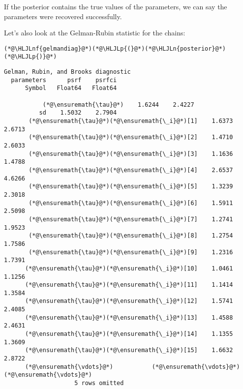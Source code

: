 \documentclass[12pt,a4paper]{article}
\newcommand{\HLJLn}[1]{#1}
\newcommand{\HLJLnf}[1]{\textcolor[RGB]{66,102,213}{#1}}
\newcommand{\HLJLp}[1]{#1}
\begin{document}
If the posterior contains the true values of the parameters, we can say the parameters were recovered successfully.

Let's also look at the Gelman-Rubin statistic for the chains:


\begin{lstlisting}
(*@\HLJLnf{gelmandiag}@*)(*@\HLJLp{(}@*)(*@\HLJLn{posterior}@*)(*@\HLJLp{)}@*)
\end{lstlisting}

\begin{lstlisting}
Gelman, Rubin, and Brooks diagnostic
  parameters      psrf    psrfci
      Symbol   Float64   Float64

           (*@\ensuremath{\tau}@*)    1.6244    2.4227
          sd    1.5032    2.7904
       (*@\ensuremath{\tau}@*)(*@\ensuremath{\_i}@*)[1]    1.6373    2.6713
       (*@\ensuremath{\tau}@*)(*@\ensuremath{\_i}@*)[2]    1.4710    2.6033
       (*@\ensuremath{\tau}@*)(*@\ensuremath{\_i}@*)[3]    1.1636    1.4788
       (*@\ensuremath{\tau}@*)(*@\ensuremath{\_i}@*)[4]    2.6537    4.6266
       (*@\ensuremath{\tau}@*)(*@\ensuremath{\_i}@*)[5]    1.3239    2.3018
       (*@\ensuremath{\tau}@*)(*@\ensuremath{\_i}@*)[6]    1.5911    2.5098
       (*@\ensuremath{\tau}@*)(*@\ensuremath{\_i}@*)[7]    1.2741    1.9523
       (*@\ensuremath{\tau}@*)(*@\ensuremath{\_i}@*)[8]    1.2754    1.7586
       (*@\ensuremath{\tau}@*)(*@\ensuremath{\_i}@*)[9]    1.2316    1.7391
      (*@\ensuremath{\tau}@*)(*@\ensuremath{\_i}@*)[10]    1.0461    1.1256
      (*@\ensuremath{\tau}@*)(*@\ensuremath{\_i}@*)[11]    1.1414    1.3584
      (*@\ensuremath{\tau}@*)(*@\ensuremath{\_i}@*)[12]    1.5741    2.4085
      (*@\ensuremath{\tau}@*)(*@\ensuremath{\_i}@*)[13]    1.4588    2.4631
      (*@\ensuremath{\tau}@*)(*@\ensuremath{\_i}@*)[14]    1.1355    1.3609
      (*@\ensuremath{\tau}@*)(*@\ensuremath{\_i}@*)[15]    1.6632    2.8722
      (*@\ensuremath{\vdots}@*)           (*@\ensuremath{\vdots}@*)         (*@\ensuremath{\vdots}@*)
                    5 rows omitted
\end{lstlisting}
\end{document}
